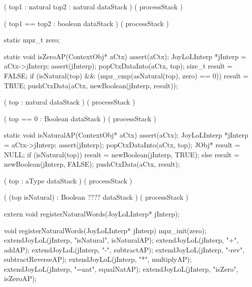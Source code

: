 \starttyping

\startWord[equal]

\preDataStack
  (
    top1 : natural
    top2 : natural
    dataStack
  )
\preProcessStack
  ( processStack )
\preConditions
\stopPreConditions

\postDataStack
  (
    top1 == top2 : boolean
    dataStack
  )
\postProcessStack
  ( processStack )
\postConditions
\stopPostConditions

\stopWord

\stoptyping

\startCCode
static  mpz_t zero;

static void isZeroAP(ContextObj* aCtx) {
  assert(aCtx);
  JoyLoLInterp *jInterp = aCtx->jInterp;
  assert(jInterp);
  popCtxDataInto(aCtx, top);
  size_t result = FALSE;
  if (isNatural(top) &&
      (mpz_cmp(asNatural(top), zero) == 0)) result = TRUE;
  pushCtxData(aCtx, newBoolean(jInterp, result));
}
\stopCCode

\starttyping

\startWord[isZero]

\preDataStack
  (
    top : natural
    dataStack
  )
\preProcessStack
  ( processStack )
\preConditions
\stopPreConditions

\postDataStack
  (
    top == 0 : Boolean
    dataStack
  )
\postProcessStack
  ( processStack )
\postConditions
\stopPostConditions

\stopWord

\stoptyping

\startCCode
static void isNaturalAP(ContextObj* aCtx) {
  assert(aCtx);
  JoyLoLInterp *jInterp = aCtx->jInterp;
  assert(jInterp);
  popCtxDataInto(aCtx, top);
  JObj* result = NULL;
  if (isNatural(top))
    result = newBoolean(jInterp, TRUE);
  else
    result = newBoolean(jInterp, FALSE);
  pushCtxData(aCtx, result);
}
\stopCCode

\startTyping

\startWord[isNatural]

\preDataStack
  (
    top : aType
    dataStack
  )
\preProcessStack
  ( processStack )
\preConditions
\stopPreConditions

\postDataStack
  ( 
    (top isNatural) : Boolean ????
    dataStack
  )
\postProcessStack
  ( processStack )
\postConditions
\stopPostConditions

\stopWord

\stopTyping

\startCHeader
extern void registerNaturalWords(JoyLoLInterp* jInterp);
\stopCHeader
{}

\startCCode
void registerNaturalWords(JoyLoLInterp* jInterp) {
  mpz_init(zero);
  extendJoyLoL(jInterp, "isNatural", isNaturalAP);
  extendJoyLoL(jInterp, "+",         addAP);
  extendJoyLoL(jInterp, "-",         subtractAP);
  extendJoyLoL(jInterp, "-rev",      subtractReverseAP);
  extendJoyLoL(jInterp, "*",         multiplyAP);
  extendJoyLoL(jInterp, "=nat",      equalNatAP);
  extendJoyLoL(jInterp, "isZero",    isZeroAP);
}
\stopCCode
